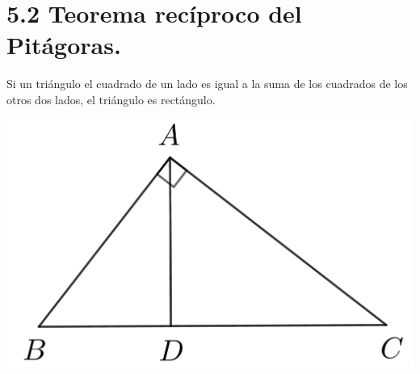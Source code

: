 \documentclass[12pt,a4paper, oneside]{book}
\begin{document}
\section{5.2 Teorema recíproco del Pitágoras.}
Si un triángulo el cuadrado de un lado es igual a la suma de los cuadrados de los otros dos lados, el triángulo es rectángulo.
\begin{center}
\includegraphics[scale=0.8]{Imagenes/pitagoras.png} 
\end{center}
\\
\end{document}
